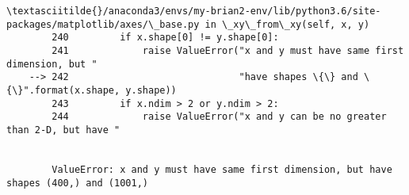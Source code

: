 \documentclass[11pt]{article}
\begin{document}
\begin{Verbatim}[commandchars=\\\{\}]
        \textasciitilde{}/anaconda3/envs/my-brian2-env/lib/python3.6/site-packages/matplotlib/axes/\_base.py in \_xy\_from\_xy(self, x, y)
        240         if x.shape[0] != y.shape[0]:
        241             raise ValueError("x and y must have same first dimension, but "
    --> 242                              "have shapes \{\} and \{\}".format(x.shape, y.shape))
        243         if x.ndim > 2 or y.ndim > 2:
        244             raise ValueError("x and y can be no greater than 2-D, but have "


        ValueError: x and y must have same first dimension, but have shapes (400,) and (1001,)

    \end{Verbatim}

    \begin{center}
    \end{center}
    { \hspace*{\fill} \\}
    
\end{document}
